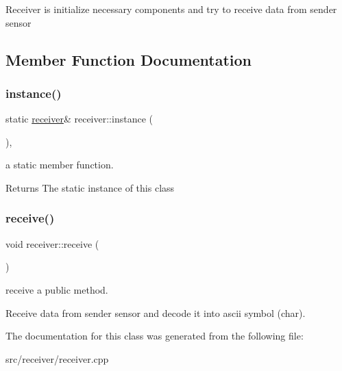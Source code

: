Receiver is initialize necessary components and try to receive data from sender sensor 

\subsection{Member Function Documentation}
\mbox{\label{classreceiver_acf3d61c94a47ebfbc2ec416c24d492fd}} 
\subsubsection{\texorpdfstring{instance()}{instance()}}
{\footnotesize\ttfamily static \hyperlink{classreceiver}{receiver}\& receiver\+::instance (\begin{DoxyParamCaption}{ }\end{DoxyParamCaption})\hspace{0.3cm}{\ttfamily [inline]}, {\ttfamily [static]}}

a static member function. \begin{DoxyReturn}{Returns}
The static instance of this class 
\end{DoxyReturn}
\mbox{\label{classreceiver_a68ac5dfbbc83c438998fb859d0532750}} 
\subsubsection{\texorpdfstring{receive()}{receive()}}
{\footnotesize\ttfamily void receiver\+::receive (\begin{DoxyParamCaption}{ }\end{DoxyParamCaption})\hspace{0.3cm}{\ttfamily [inline]}}



receive a public method. 

Receive data from sender sensor and decode it into ascii symbol (char). 

The documentation for this class was generated from the following file\+:\begin{DoxyCompactItemize}
\item 
src/receiver/receiver.\+cpp\end{DoxyCompactItemize}
